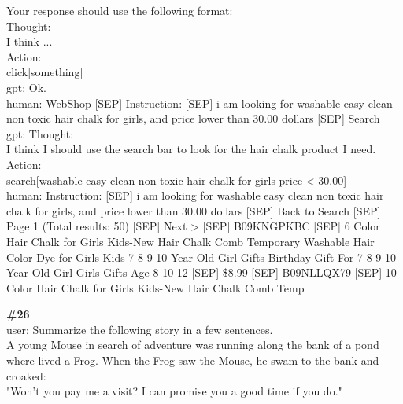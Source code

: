 \documentclass[10pt]{article}
\begin{document}
\begin{Form}
\begin{tcolorbox}[colback=convbg,colframe=itemframe,boxrule=0.8pt,arc=2pt,breakable,left=6pt,right=6pt,top=5pt,bottom=5pt]
{Your response should use the following format: \\[2pt]
Thought: \\[2pt]
I think ... \\[2pt]
Action: \\[2pt]
click[something] \\[2pt]
gpt: Ok. \\[2pt]
human: WebShop [SEP] Instruction: [SEP] i am looking for washable easy clean non toxic hair chalk for girls, and price lower than 30.00 dollars [SEP] Search \\[2pt]
gpt: Thought: \\[2pt]
I think I should use the search bar to look for the hair chalk product I need. \\[2pt]
Action: \\[2pt]
search[washable easy clean non toxic hair chalk for girls price < 30.00] \\[2pt]
human: Instruction: [SEP] i am looking for washable easy clean non toxic hair chalk for girls, and price lower than 30.00 dollars [SEP] Back to Search [SEP] Page 1 (Total results: 50) [SEP] Next > [SEP] B09KNGPKBC [SEP] 6 Color Hair Chalk for Girls Kids-New Hair Chalk Comb Temporary Washable Hair Color Dye for Girls Kids-7 8 9 10 Year Old Girl Gifts-Birthday Gift For 7 8 9 10 Year Old Girl-Girls Gifts Age 8-10-12 [SEP] \$8.99 [SEP] B09NLLQX79 [SEP] 10 Color Hair Chalk for Girls Kids-New Hair Chalk Comb Temp}
\end{tcolorbox}
\vspace{-1pt}
\CheckBox[name=q25c,width=1.6ex,height=1.6ex,bordercolor={0.45 0.45 0.45}]{~\textcolor{cbox}{COMPACT}}\quad
\CheckBox[name=q25d,width=1.6ex,height=1.6ex,bordercolor={0.45 0.45 0.45}]{~\textcolor{dbox}{DIFFUSE}}\quad
\CheckBox[name=q25n,width=1.6ex,height=1.6ex,bordercolor={0.45 0.45 0.45}]{~\textcolor{nbox}{NONE}}
\vspace{8pt}
\begin{tcolorbox}[colback=convbg,colframe=itemframe,boxrule=0.8pt,arc=2pt,breakable,left=6pt,right=6pt,top=5pt,bottom=5pt]
{\footnotesize\textbf{\#26}}\\[3pt]
{\footnotesize user: Summarize the following story in a few sentences. \\[2pt]
A young Mouse in search of adventure was running along the bank of a pond where lived a Frog. When the Frog saw the Mouse, he swam to the bank and croaked: \\[2pt]
"Won't you pay me a visit? I can promise you a good time if you do." \\[2pt]
}
\end{tcolorbox}
\end{Form}
\end{document}
